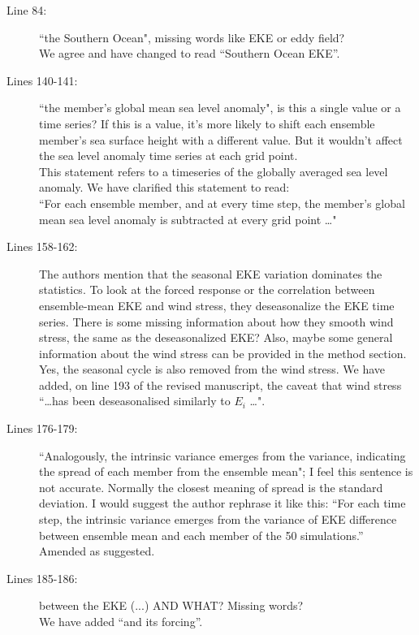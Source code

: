 \documentclass[11pt]{article}
\begin{document}
{\color{blue} 
\begin{description}
\item[ Line 84: ] ``the Southern Ocean", missing words like EKE or eddy field?\\
{\color{black}  We agree and have changed to read ``Southern Ocean EKE''.}

\item[ Lines 140-141:] ``the member's global mean sea level anomaly", is this a single value or a time series? If this is a value, it's more likely to shift each ensemble member's sea surface height with a different value. But it wouldn't affect the sea level anomaly time series at each grid point. \\
{\color{black} This statement refers to a timeseries of the globally averaged sea level anomaly. We have clarified this statement to read:\\
 ``For each ensemble member, and at every time step, the member's global mean sea level anomaly is subtracted at every grid point  \ldots" }

\item[Lines 158-162:] The authors mention that the seasonal EKE variation dominates the statistics. To look at the forced response or the correlation between ensemble-mean EKE and wind stress, they deseasonalize the EKE time series. There is some missing information about how they smooth wind stress, the same as the deseasonalized EKE? Also, maybe some general information about the wind stress can be provided in the method section.\\
{\color{black} Yes, the seasonal cycle is also removed from the wind stress. We have added, on line 193 of the revised manuscript, the caveat that wind stress ``\ldots has been deseasonalised similarly to $E_i$ \ldots". }

\item[Lines 176-179:] ``Analogously, the intrinsic variance emerges from the variance, indicating the spread of each member from the ensemble mean"; I feel this sentence is not accurate. Normally the closest meaning of spread is the standard deviation. I would suggest the author rephrase it like this: ``For each time step, the intrinsic variance emerges from the variance of EKE difference between ensemble mean and each member of the 50 simulations.'' \\
{\color{black} Amended as suggested. }

\item[Lines 185-186:] between the EKE (...) AND WHAT? Missing words?\\
{\color{black} We have added ``and its forcing''. }


\end{description}}
\end{document}

